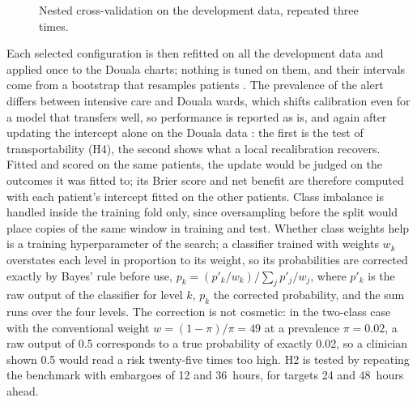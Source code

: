 \begin{figure}[htbp]
\centering
{}
\caption{Nested cross-validation on the development data, repeated three times.}\label{fig:nested-cv}
\end{figure}

Each selected configuration is then refitted on all the development data and applied once to the Douala charts; nothing is tuned on them, and their intervals come from a bootstrap that resamples patients \parencite{collins2016}. The prevalence of the alert differs between intensive care and Douala wards, which shifts calibration even for a model that transfers well, so performance is reported as is, and again after updating the intercept alone on the Douala data \parencite{janssen2008}: the first is the test of transportability (H4), the second shows what a local recalibration recovers. Fitted and scored on the same patients, the update would be judged on the outcomes it was fitted to; its Brier score and net benefit are therefore computed with each patient's intercept fitted on the other patients. Class imbalance is handled inside the training fold only, since oversampling before the split would place copies of the same window in training and test. Whether class weights help is a training hyperparameter of the search; a classifier trained with weights $w_k$ overstates each level in proportion to its weight, so its probabilities are corrected exactly by Bayes' rule before use, $p_k = (p'_k/w_k) / \sum_j p'_j/w_j$, where $p'_k$ is the raw output of the classifier for level $k$, $p_k$ the corrected probability, and the sum runs over the four levels. The correction is not cosmetic: in the two-class case with the conventional weight $w = (1-\pi)/\pi = 49$ at a prevalence $\pi = 0.02$, a raw output of 0.5 corresponds to a true probability of exactly 0.02, so a clinician shown 0.5 would read a risk twenty-five times too high. H2 is tested by repeating the benchmark with embargoes of 12 and 36~hours, for targets 24 and 48~hours ahead.

